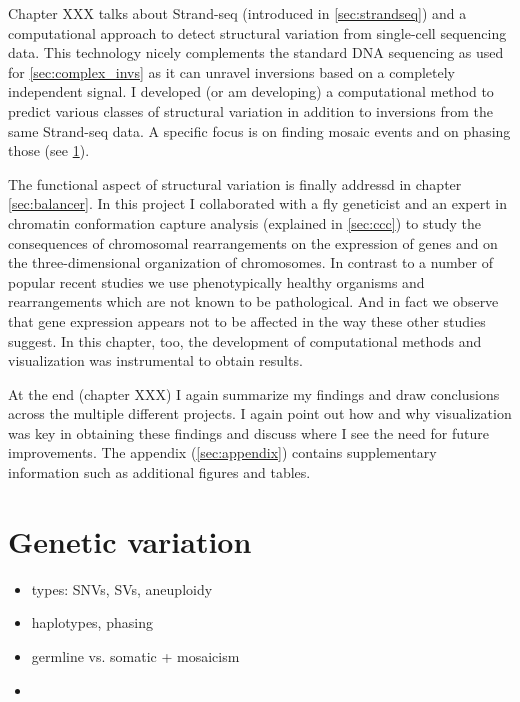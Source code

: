 Chapter XXX  talks about Strand-seq (introduced in \cref{sec:strandseq})
and a computational approach to detect structural variation from single-cell
sequencing data. This technology nicely complements the standard DNA sequencing
as used for \cref{sec:complex_invs} as it can unravel inversions based on a
completely independent signal. I developed (or am developing) a computational
method to predict various classes of structural variation in addition to
inversions from the same Strand-seq data. A specific focus is on finding
mosaic events and on phasing those (see \cref{sec:variation}).

The functional aspect of structural variation is finally addressd in chapter
\cref{sec:balancer}. In this project I collaborated with a fly geneticist and an
expert in chromatin conformation capture analysis (explained in \cref{sec:ccc})
to study the consequences of chromosomal rearrangements on the expression of
genes and on the three-dimensional organization of chromosomes. In contrast to
a number of popular recent studies we use phenotypically healthy organisms and
rearrangements which are not known to be pathological. And in fact we
observe that gene expression appears not to be affected in the way these other
studies suggest. In this chapter, too, the development of computational methods
and visualization was instrumental to obtain results.

At the end (chapter XXX) I again summarize my
findings and draw conclusions across the multiple different projects. I again
point out how and why visualization was key in obtaining these findings and
discuss where I see the need for future improvements. The appendix
(\cref{sec:appendix}) contains supplementary information such as additional
figures and tables.



\section{Genetic variation}
\label{sec:variation}

\begin{itemize}
\item types: SNVs, SVs, aneuploidy
\item haplotypes, phasing
\item germline vs. somatic + mosaicism
\item
\end{itemize}



